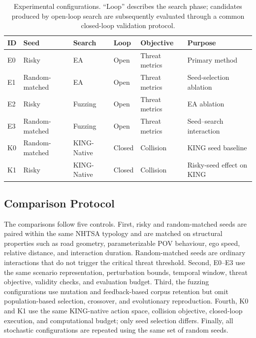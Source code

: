 \begin{table}[t]
    \centering
    \small
    \caption{Experimental configurations. ``Loop'' describes the search phase; candidates produced by open-loop search are subsequently evaluated through a common closed-loop validation protocol.}
    \label{tab:experimental_configurations}
    \begin{tabularx}{\textwidth}{@{}lllllX@{}}
        \toprule
        \textbf{ID} & \textbf{Seed} & \textbf{Search} & \textbf{Loop} & \textbf{Objective} & \textbf{Purpose} \\
        \midrule
        E0 & Risky & EA & Open & Threat metrics & Primary method \\
        E1 & Random-matched & EA & Open & Threat metrics & Seed-selection ablation \\
        E2 & Risky & Fuzzing & Open & Threat metrics & EA ablation \\
        E3 & Random-matched & Fuzzing & Open & Threat metrics & Seed--search interaction \\
        K0 & Random-matched & KING-Native & Closed & Collision & KING seed baseline \\
        K1 & Risky & KING-Native & Closed & Collision & Risky-seed effect on KING \\
        \bottomrule
    \end{tabularx}
\end{table}

\subsection{Comparison Protocol}
\label{sec:comparison_protocol}

The comparisons follow five controls. First, risky and random-matched seeds are paired within the same NHTSA typology and are matched on structural properties such as road geometry, parameterizable POV behaviour, ego speed, relative distance, and interaction duration. Random-matched seeds are ordinary interactions that do not trigger the critical threat threshold. Second, E0--E3 use the same scenario representation, perturbation bounds, temporal window, threat objective, validity checks, and evaluation budget. Third, the fuzzing configurations use mutation and feedback-based corpus retention but omit population-based selection, crossover, and evolutionary reproduction. Fourth, K0 and K1 use the same KING-native action space, collision objective, closed-loop execution, and computational budget; only seed selection differs. Finally, all stochastic configurations are repeated using the same set of random seeds.

